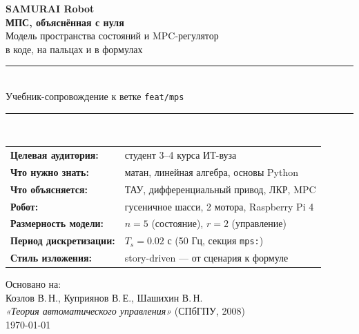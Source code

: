 \documentclass[12pt, a4paper, openany]{book}
\begin{document}
\begin{titlepage}
\centering
\vspace*{2cm}
{\Huge\bfseries SAMURAI Robot}\\[0.4cm]
{\Large\bfseries МПС, объяснённая с нуля}\\[0.3cm]
{\large Модель пространства состояний и MPC-регулятор\\
        в коде, на пальцах и в формулах}\\[1cm]
\rule{\textwidth}{1pt}\\[0.5cm]
{\large Учебник-сопровождение к ветке \texttt{feat/mps}}\\[0.5cm]
\rule{\textwidth}{1pt}\\[2cm]

\begin{tabular}{ll}
\textbf{Целевая аудитория:} & студент 3--4 курса ИТ-вуза\\
\textbf{Что нужно знать:}   & матан, линейная алгебра, основы Python\\
\textbf{Что объясняется:}   & ТАУ, дифференциальный привод, ЛКР, MPC\\
\textbf{Робот:}             & гусеничное шасси, 2 мотора, Raspberry Pi 4\\
\textbf{Размерность модели:}& $n = 5$ (состояние), $r = 2$ (управление)\\
\textbf{Период дискретизации:} & $T_s = 0.02$ с (50 Гц, секция \texttt{mps:})\\
\textbf{Стиль изложения:}   & story-driven --- от сценария к формуле\\
\end{tabular}

\vfill
{\large Основано на:\\
Козлов В.\,Н., Куприянов В.\,Е., Шашихин В.\,Н.\\
\textit{«Теория автоматического управления»} (СПбГПУ, 2008)}\\[0.4cm]
{\large \today}
\end{titlepage}

\tableofcontents
\newpage














\end{document}
